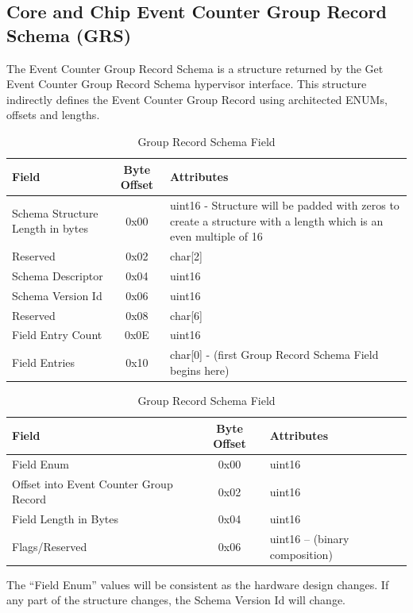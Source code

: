 \documentclass[14]{article}
\begin{document}
\subsection{Core and Chip Event Counter Group Record Schema
(GRS)}
The Event Counter Group Record Schema is a structure returned by the Get Event
Counter Group Record Schema hypervisor interface. This structure indirectly
defines the Event Counter Group Record using architected ENUMs, offsets and
lengths.

\begin{table}[hd]
  \begin{tabular}[l]{|p{5cm}|c|p{7cm}|}
    \hline
    \textbf{Field} & \textbf{Byte Offset} & \textbf{Attributes} \\
    \hline
    Schema Structure Length in bytes & 0x00 & uint16 - Structure will be padded
                                              with zeros to create a structure
                                              with a length which is an even
                                              multiple of 16 \\ \hline
    Reserved & 0x02 & char[2] \\ \hline
    Schema Descriptor & 0x04 & uint16 \\ \hline
    Schema Version Id & 0x06 & uint16 \\ \hline
    Reserved & 0x08 & char[6] \\ \hline
    Field Entry Count & 0x0E & uint16 \\ \hline
    Field Entries & 0x10 & char[0] - (first Group Record Schema Field begins here)
    \\ \hline
  \end{tabular}
  \caption{Group Record Schema}

  \begin{tabular}[l]{|p{5cm}|c|p{7cm}|}
    \hline
    \textbf{Field} & \textbf{Byte Offset} & \textbf{Attributes} \\
    \hline
    Field Enum & 0x00 & uint16 \\ \hline
    Offset into Event Counter Group Record & 0x02 & uint16 \\ \hline
    Field Length in Bytes & 0x04 & uint16 \\ \hline
    Flags/Reserved & 0x06 & uint16 – (binary composition) \\ \hline
  \end{tabular}
  \caption{Group Record Schema Field}
\end{table}

The “Field Enum” values will be consistent as the hardware design changes. If
any part of the structure changes, the Schema Version Id will change.
\end{document}
